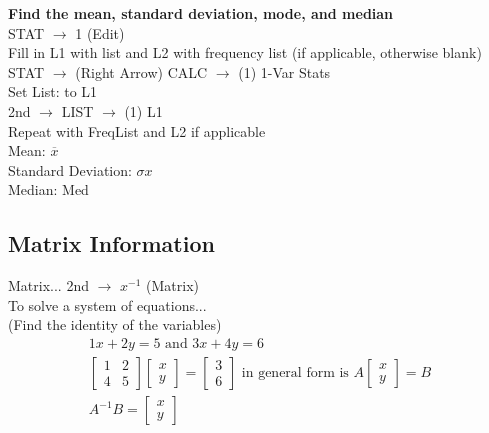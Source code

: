 \documentclass[twocolumn]{article}
\newcommand*\ra{$\rightarrow$ }
\newcommand{\bd}{\textbf}
\begin{document}
	\noindent \bd{Find the mean, standard deviation, mode, and median} \\
	\indent STAT \ra 1 (Edit) \\
	\indent Fill in L1 with list and L2 with frequency list (if applicable, otherwise blank) \\
	\indent STAT \ra (Right Arrow) CALC \ra (1) 1-Var Stats \\
	\indent Set List: to L1 \\
	\indent 2nd \ra LIST \ra (1) L1 \\
	\indent Repeat with FreqList and L2 if applicable \\
	\indent Mean: $\overline{x}$ \\
	\indent Standard Deviation: $\sigma{}x$ \\
	\indent Median: Med \\
	
	\subsection*{Matrix Information}
	Matrix...  2nd \ra $x^{-1}$ (Matrix) \\
	To solve a system of equations... \\
	(Find the identity of the variables)
	\begin{align*}
		1x + 2y = 5 \text{ and } 3x + 4y = 6 \\
		\begin{bmatrix}
			1 & 2 \\
			4 & 5
		\end{bmatrix}
		\begin{bmatrix}
			x \\
			y
		\end{bmatrix}
		=
		\begin{bmatrix}
			3 \\
			6
		\end{bmatrix} \text{ in general form is }
		A
		\begin{bmatrix}
			x \\
			y
		\end{bmatrix}
		=
		B \\
		A^{-1} B =
		\begin{bmatrix}
			x \\
			y
		\end{bmatrix}
	\end{align*}
	
\end{document}
